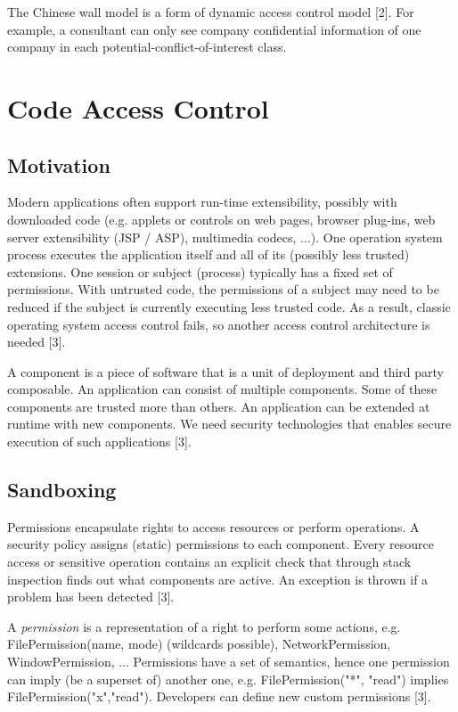 The Chinese wall model is a form of dynamic access control model [2]. For example, a consultant can only see company confidential information of one company in each potential-conflict-of-interest class.






\section{Code Access Control}

\subsection{Motivation}

Modern applications often support run-time extensibility, possibly with downloaded code (e.g. applets or controls on web pages, browser plug-ins, web server extensibility (JSP / ASP), multimedia codecs, ...). One operation system process executes the application itself and all of its (possibly less trusted) extensions. One session or subject (process) typically has a fixed set of permissions. With untrusted code, the permissions of a subject may need to be reduced if the subject is currently executing less trusted code. As a result, classic operating system access control fails, so another access control architecture is needed [3].

A component is a piece of software that is a unit of deployment and third party composable. An application can consist of multiple components. Some of these components are trusted more than others. An application can be extended at runtime with new components. We need security technologies that enables secure execution of such applications [3].


\subsection{Sandboxing}

Permissions encapsulate rights to access resources or perform operations. A security policy assigns (static) permissions to each component. Every resource access or sensitive operation contains an explicit check that through stack inspection finds out what components are active. An exception is thrown if a problem has been detected [3].

A \emph{permission} is a representation of a right to perform some actions, e.g. FilePermission(name, mode) (wildcards possible), NetworkPermission, WindowPermission, ... Permissions have a set of semantics, hence one permission can imply (be a superset of) another one, e.g. FilePermission("*", "read") implies FilePermission("x","read"). Developers can define new custom permissions [3].

